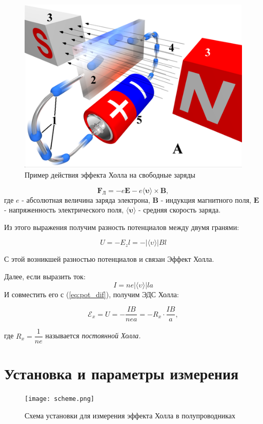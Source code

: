 \documentclass{physlab}
\begin{document}
\begin {figure}[H]
	\begin{center}
		\includegraphics[width = 0.35 \textwidth]{hall_effect}
		\caption{Пример действия эффекта Холла на свободные заряды}
	\end{center}
\end {figure}



$$\boldsymbol{F_\text{Л}}  = -e \boldsymbol{E} - e \langle \boldsymbol{\upsilon} \rangle \times \boldsymbol{B},$$
где $e$ - абсолютная величина заряда электрона, $\boldsymbol{B}$ - индукция магнитного поля, $\boldsymbol{E}$ - напряженность электрического поля, $ \langle \boldsymbol{\upsilon} \rangle$ - средняя скорость заряда.

Из этого выражения получим разность потенциалов между двумя гранями:

\begin{equation}
U = -E_zl = - | \langle \upsilon \rangle | B l
\label{eq:pot_dif}
\end{equation}

С этой возникшей разностью потенциалов и связан Эффект Холла.

Далее, если выразить ток:
$$ I = ne |\langle \upsilon \rangle |  l a$$
И совместить его с (\ref{eq:pot_dif}), получим ЭДС Холла:

\begin{equation}
\mathscr{E}_x = U = - \dfrac{IB}{nea} = -R_x \cdot \dfrac{IB}{a},
\label{eq:hall}
\end{equation}

где $R_x = \dfrac{1}{ne}$ называется \textit{постоянной Холла.}

\section{Установка и параметры измерения}

\begin{figure}
\centering
    \texttt{[image: scheme.png]}
\caption{Схема установки для измерения эффекта Холла в полупроводниках}
\end{figure} 
\end{document}
